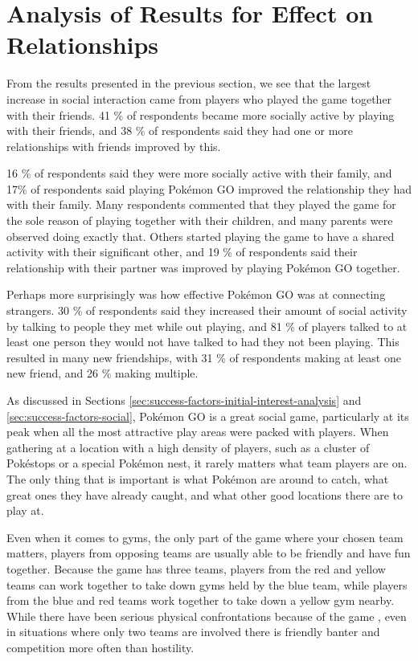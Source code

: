 \section{Analysis of Results for Effect on Relationships}
\label{sec:mental-health-relationships}

From the results presented in the previous section, we see that the largest increase in social interaction came from players who played the game together with their friends. 41 \% of respondents became more socially active by playing with their friends, and 38 \% of respondents said they had one or more relationships with friends improved by this.

16 \% of respondents said they were more socially active with their family, and 17\% of respondents said playing Pokémon GO improved the relationship they had with their family. Many respondents commented that they played the game for the sole reason of playing together with their children, and many parents were observed doing exactly that. Others started playing the game to have a shared activity with their significant other, and 19 \% of respondents said their relationship with their partner was improved by playing Pokémon GO together.

Perhaps more surprisingly was how effective Pokémon GO was at connecting strangers. 30 \% of respondents said they increased their amount of social activity by talking to people they met while out playing, and 81 \% of players talked to at least one person they would not have talked to had they not been playing. This resulted in many new friendships, with 31 \% of respondents making at least one new friend, and 26 \% making multiple.

As discussed in Sections \ref{sec:success-factors-initial-interest-analysis} and \ref{sec:success-factors-social}, Pokémon GO is a great social game, particularly at its peak when all the most attractive play areas were packed with players. When gathering at a location with a high density of players, such as a cluster of Pokéstops or a special Pokémon nest, it rarely matters what team players are on. The only thing that is important is what Pokémon are around to catch, what great ones they have already caught, and what other good locations there are to play at.

Even when it comes to gyms, the only part of the game where your chosen team matters, players from opposing teams are usually able to be friendly and have fun together. Because the game has three teams, players from the red and yellow teams can work together to take down gyms held by the blue team, while players from the blue and red teams work together to take down a yellow gym nearby. While there have been serious physical confrontations because of the game , even in situations where only two teams are involved there is friendly banter and competition more often than hostility.


